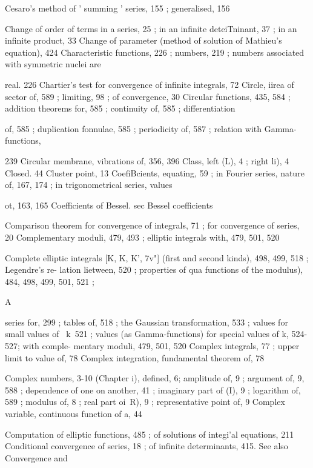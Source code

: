 Cesaro's method of ' summing ' series, 155 ; generalised, 156

Change of order of terms in a series, 25 ; in an infinite deteiTninant, 37 ; in an infinite product, 33
Change of parameter (method of solution of Mathieu's equation), 424
Characteristic functions, 226 ; numbers, 219 ; numbers associated with symmetric nuclei are

real. 226
Chartier's test for convergence of infinite integrals, 72
Circle, iirea of sector of, 589 ; limiting, 98 ; of convergence, 30
Circular functions, 435, 584 ; addition theorems for, 585 ; continuity of, 585 ; differentiation

of, 585 ; duplication fonnulae, 585 ; periodicity of, 587 ; relation with Gamma-functions,

239
Circular membrane, vibrations of, 356, 396
Class, left (L), 4 ; right  li), 4
Closed. 44
Cluster point, 13
CoefiBcients, equating, 59 ; in Fourier series, nature of, 167, 174 ; in trigonometrical series, values

ot, 163, 165
Coefficients of Bessel. sec Bessel coefficients

Comparison theorem for convergence of integrals, 71 ; for convergence of series, 20
Complementary moduli, 479, 493 ; elliptic integrals with, 479, 501, 520

Complete elliptic integrals [K, K, K', 7v"] (first and second kinds), 498, 499, 518 ; Legendre's re-
lation lietween, 520 ; properties of  qua functions of the modulus), 484, 498, 499, 501, 521 ;

 A


series for, 299 ; tables of, 518 ; the Gaussian transformation, 533 ; values for small values
of \ k\, 521 ; values (as Gamma-functions) for special values of k, 524-527; with comple-
mentary moduli, 479, 501, 520
Complex integrals, 77 ; upper limit to value of, 78
Complex integration, fundamental theorem of, 78

Complex numbers, 3-10 (Chapter i), defined, 6; amplitude of, 9 ; argument of, 9, 588 ; dependence
of one on another, 41 ; imaginary part of (I), 9 ; logarithm of, 589 ; modulus of, 8 ; real part
oi\ R), 9 ; representative point of, 9
Complex variable, continuous function of a, 44

Computation of elliptic functions, 485 ; of solutions of integi'al equations, 211
Conditional convergence of series, 18 ; of infinite determinants, 415. See also Convergence and

